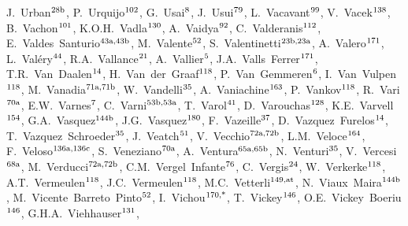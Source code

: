 \begin{flushleft}
J.~Urban$^\textrm{\scriptsize 28b}$,    
P.~Urquijo$^\textrm{\scriptsize 102}$,    
G.~Usai$^\textrm{\scriptsize 8}$,    
J.~Usui$^\textrm{\scriptsize 79}$,    
L.~Vacavant$^\textrm{\scriptsize 99}$,    
V.~Vacek$^\textrm{\scriptsize 138}$,    
B.~Vachon$^\textrm{\scriptsize 101}$,    
K.O.H.~Vadla$^\textrm{\scriptsize 130}$,    
A.~Vaidya$^\textrm{\scriptsize 92}$,    
C.~Valderanis$^\textrm{\scriptsize 112}$,    
E.~Valdes~Santurio$^\textrm{\scriptsize 43a,43b}$,    
M.~Valente$^\textrm{\scriptsize 52}$,    
S.~Valentinetti$^\textrm{\scriptsize 23b,23a}$,    
A.~Valero$^\textrm{\scriptsize 171}$,    
L.~Val\'ery$^\textrm{\scriptsize 44}$,    
R.A.~Vallance$^\textrm{\scriptsize 21}$,    
A.~Vallier$^\textrm{\scriptsize 5}$,    
J.A.~Valls~Ferrer$^\textrm{\scriptsize 171}$,    
T.R.~Van~Daalen$^\textrm{\scriptsize 14}$,    
H.~Van~der~Graaf$^\textrm{\scriptsize 118}$,    
P.~Van~Gemmeren$^\textrm{\scriptsize 6}$,    
I.~Van~Vulpen$^\textrm{\scriptsize 118}$,    
M.~Vanadia$^\textrm{\scriptsize 71a,71b}$,    
W.~Vandelli$^\textrm{\scriptsize 35}$,    
A.~Vaniachine$^\textrm{\scriptsize 163}$,    
P.~Vankov$^\textrm{\scriptsize 118}$,    
R.~Vari$^\textrm{\scriptsize 70a}$,    
E.W.~Varnes$^\textrm{\scriptsize 7}$,    
C.~Varni$^\textrm{\scriptsize 53b,53a}$,    
T.~Varol$^\textrm{\scriptsize 41}$,    
D.~Varouchas$^\textrm{\scriptsize 128}$,    
K.E.~Varvell$^\textrm{\scriptsize 154}$,    
G.A.~Vasquez$^\textrm{\scriptsize 144b}$,    
J.G.~Vasquez$^\textrm{\scriptsize 180}$,    
F.~Vazeille$^\textrm{\scriptsize 37}$,    
D.~Vazquez~Furelos$^\textrm{\scriptsize 14}$,    
T.~Vazquez~Schroeder$^\textrm{\scriptsize 35}$,    
J.~Veatch$^\textrm{\scriptsize 51}$,    
V.~Vecchio$^\textrm{\scriptsize 72a,72b}$,    
L.M.~Veloce$^\textrm{\scriptsize 164}$,    
F.~Veloso$^\textrm{\scriptsize 136a,136c}$,    
S.~Veneziano$^\textrm{\scriptsize 70a}$,    
A.~Ventura$^\textrm{\scriptsize 65a,65b}$,    
N.~Venturi$^\textrm{\scriptsize 35}$,    
V.~Vercesi$^\textrm{\scriptsize 68a}$,    
M.~Verducci$^\textrm{\scriptsize 72a,72b}$,    
C.M.~Vergel~Infante$^\textrm{\scriptsize 76}$,    
C.~Vergis$^\textrm{\scriptsize 24}$,    
W.~Verkerke$^\textrm{\scriptsize 118}$,    
A.T.~Vermeulen$^\textrm{\scriptsize 118}$,    
J.C.~Vermeulen$^\textrm{\scriptsize 118}$,    
M.C.~Vetterli$^\textrm{\scriptsize 149,at}$,    
N.~Viaux~Maira$^\textrm{\scriptsize 144b}$,    
M.~Vicente~Barreto~Pinto$^\textrm{\scriptsize 52}$,    
I.~Vichou$^\textrm{\scriptsize 170,*}$,    
T.~Vickey$^\textrm{\scriptsize 146}$,    
O.E.~Vickey~Boeriu$^\textrm{\scriptsize 146}$,    
G.H.A.~Viehhauser$^\textrm{\scriptsize 131}$,    

\end{flushleft}
